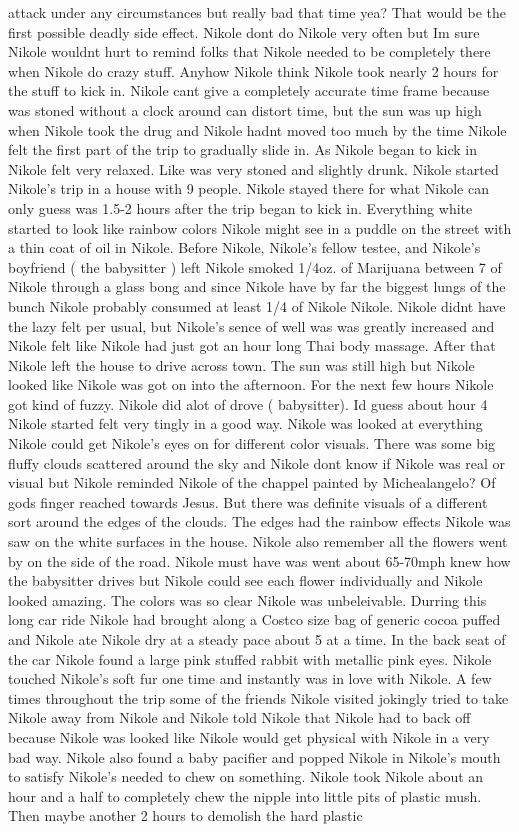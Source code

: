 \documentclass[12pt]{book}
\begin{document}
attack under any circumstances but really bad that time yea? That would be the first possible deadly side effect. Nikole dont do Nikole very often but Im sure Nikole wouldnt hurt to remind folks that Nikole needed to be completely there when Nikole do crazy stuff. Anyhow Nikole think Nikole took nearly 2 hours for the stuff to kick in. Nikole cant give a completely accurate time frame because was stoned without a clock around can distort time, but the sun was up high when Nikole took the drug and Nikole hadnt moved too much by the time Nikole felt the first part of the trip to gradually slide in. As Nikole began to kick in Nikole felt very relaxed. Like was very stoned and slightly drunk. Nikole started Nikole's trip in a house with 9 people. Nikole stayed there for what Nikole can only guess was 1.5-2 hours after the trip began to kick in. Everything white started to look like rainbow colors Nikole might see in a puddle on the street with a thin coat of oil in Nikole. Before Nikole, Nikole's fellow testee, and Nikole's boyfriend ( the babysitter ) left Nikole smoked 1/4oz. of Marijuana between 7 of Nikole through a glass bong and since Nikole have by far the biggest lungs of the bunch Nikole probably consumed at least 1/4 of Nikole Nikole. Nikole didnt have the lazy felt per usual, but Nikole's sence of well was was greatly increased and Nikole felt like Nikole had just got an hour long Thai body massage. After that Nikole left the house to drive across town. The sun was still high but Nikole looked like Nikole was got on into the afternoon. For the next few hours Nikole got kind of fuzzy. Nikole did alot of drove ( babysitter). Id guess about hour 4 Nikole started felt very tingly in a good way. Nikole was looked at everything Nikole could get Nikole's eyes on for different color visuals. There was some big fluffy clouds scattered around the sky and Nikole dont know if Nikole was real or visual but Nikole reminded Nikole of the chappel painted by Michealangelo? Of gods finger reached towards Jesus. But there was definite visuals of a different sort around the edges of the clouds. The edges had the rainbow effects Nikole was saw on the white surfaces in the house. Nikole also remember all the flowers went by on the side of the road. Nikole must have was went about 65-70mph knew how the babysitter drives but Nikole could see each flower individually and Nikole looked amazing. The colors was so clear Nikole was unbeleivable. Durring this long car ride Nikole had brought along a Costco size bag of generic cocoa puffed and Nikole ate Nikole dry at a steady pace about 5 at a time. In the back seat of the car Nikole found a large pink stuffed rabbit with metallic pink eyes. Nikole touched Nikole's soft fur one time and instantly was in love with Nikole. A few times throughout the trip some of the friends Nikole visited jokingly tried to take Nikole away from Nikole and Nikole told Nikole that Nikole had to back off because Nikole was looked like Nikole would get physical with Nikole in a very bad way. Nikole also found a baby pacifier and popped Nikole in Nikole's mouth to satisfy Nikole's needed to chew on something. Nikole took Nikole about an hour and a half to completely chew the nipple into little pits of plastic mush. Then maybe another 2 hours to demolish the hard plastic 
\end{document}
